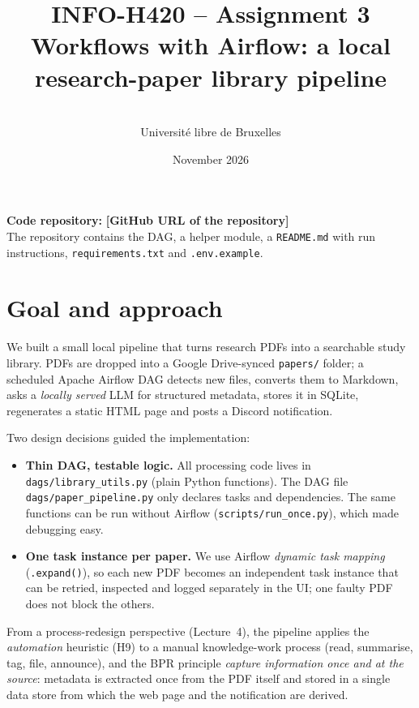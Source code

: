 \documentclass[11pt,a4paper]{article}
\title{\textbf{INFO-H420 -- Assignment 3}\\[2pt]\large Workflows with Airflow: a local research-paper library pipeline}
\author{\studentA \quad \studentB \quad \studentC\\[2pt]
\small Université libre de Bruxelles}
\date{November 2026}
\newcommand{\fillin}[1]{\textcolor{todo}{\textbf{[#1]}}}
\newcommand{\githuburl}{\fillin{GitHub URL of the repository}}
\begin{document}
\maketitle

\noindent\textbf{Code repository:} \githuburl\\
The repository contains the DAG, a helper module, a \texttt{README.md} with run instructions,
\texttt{requirements.txt} and \texttt{.env.example}.

\section{Goal and approach}
We built a small local pipeline that turns research PDFs into a searchable study library.
PDFs are dropped into a Google Drive-synced \texttt{papers/} folder; a scheduled Apache Airflow DAG
detects new files, converts them to Markdown, asks a \emph{locally served} LLM for structured metadata,
stores it in SQLite, regenerates a static HTML page and posts a Discord notification.

Two design decisions guided the implementation:
\begin{itemize}
  \item \textbf{Thin DAG, testable logic.} All processing code lives in \texttt{dags/library\_utils.py}
        (plain Python functions). The DAG file \texttt{dags/paper\_pipeline.py} only declares tasks
        and dependencies. The same functions can be run without Airflow (\texttt{scripts/run\_once.py}),
        which made debugging easy.
  \item \textbf{One task instance per paper.} We use Airflow \emph{dynamic task mapping}
        (\texttt{.expand()}), so each new PDF becomes an independent task instance that can be
        retried, inspected and logged separately in the UI; one faulty PDF does not block the others.
\end{itemize}
From a process-redesign perspective (Lecture~4), the pipeline applies the \emph{automation} heuristic
(H9) to a manual knowledge-work process (read, summarise, tag, file, announce), and the BPR principle
\emph{capture information once and at the source}: metadata is extracted once from the PDF itself and
stored in a single data store from which the web page and the notification are derived.
\end{document}
